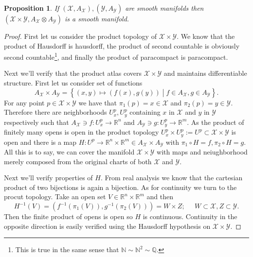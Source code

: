 \documentclass[11pt]{amsart}
\newtheorem{proposition}[theorem]{Proposition}
\theoremstyle{definition}
\def\scriptx{{\mathcal X}}
\def\scripty{{\mathcal Y}}
\begin{document}
\begin{proposition}
	If $(\scriptx, A_\scriptx),(\scripty, A_\scripty)$ are smooth manifolds then $(\scriptx \times \scripty, A_\scriptx \otimes A_\scripty)$ is a smooth manifold.
\end{proposition}
\begin{proof}
	First let us consider the product topology of $\scriptx \times \scripty.$ We know that the product of Hausdorff is hausdorff, the product of second countable is obviously second countable\footnote{This is true in the same sense that $ \mathbb{N} \sim \mathbb{N}^2 \sim \mathbb{Q}.$}, and finally the product of paracompact is paracompact.

	Next we'll verify that the product atlas covers $\scriptx \times \scripty$ and maintains differentiable structure. First let us consider set of functions
	\begin{equation*}
		A_\scriptx \times A_\scripty = \left\{(x,y) \mapsto  (f(x), g(y))\mathrel{}\middle|\mathrel{} f \in A_\scriptx, g \in A_\scripty\right\}.
	\end{equation*}
	For any point $p \in \scriptx \times \scripty$ we have that $\pi_1(p) = x \in \scriptx$ and $\pi_2(p) = y \in \scripty$. Therefore there are neighborhoods $U_x^p, U_y^p$ containing $x$ in $\scriptx$ and $y$ in $\scripty$ respectively such that $A_\scriptx \ni f: U_x^p \to \mathbb{R}^{n}$ and $A_\scripty \ni g: U_y^p \to \mathbb{R}^m.$ As the product of finitely many opens is open in the product topology $U_x^p \times U_y^p := U^p \subset \scriptx \times \scripty$ is open and there is a map $H: U^p \to \mathbb{R}^n \times \mathbb{R}^m \in A_\scriptx \times A_\scripty$ with $\pi_1 \circ H = f, \pi_2 \circ H = g.$ All this is to say, we can cover the manifold $\scriptx \times \scripty$ with maps and neiughborhood merely composed from the original charts of both $\scriptx$ and $\scripty.$

	Next we'll verify properties of $H.$ From real analysis we know that the cartesian product of two bijections is again a bijection. As for continuity we turn to the procut topology. Take an open set $V \in \mathbb{R}^n \times \mathbb{R}^m$ and then
	\begin{equation*}
		H^{-1}(V) = (f^{-1}(\pi_1(V)), g^{-1}(\pi_2(V))) = W \times Z;\;\;\;\;\;W \subset \scriptx, Z \subset \scripty.
	\end{equation*}
	Then the finite product of opens is open so $H$ is continuous. Continuity in the opposite direction is easily verified using the Hausdorff hypothesis on $\scriptx \times \scripty.$ 


\end{proof}
\end{document}

